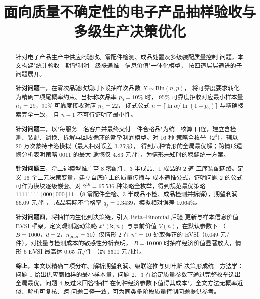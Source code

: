 \documentclass[withoutpreface,bwprint]{cumcmthesis}
\title{面向质量不确定性的电子产品抽样验收与多级生产决策优化}
\begin{document}
\maketitle

\begin{abstract}
针对电子产品生产中供应商验收、零配件检测、成品处置及多级装配质量控制
问题，本文构建"统计验收—期望利润—级联递推—信息价值"一体化模型，
按四道层层递进的子问题展开。

\textbf{针对问题一}，在零次品验收规则下设抽样次品数 $X \sim \mathrm{Bin}(n, p)$，
将可靠度要求转化为精确二项尾概率约束。当标称次品率 $p_0 = 10\%$ 时，
95\% 可靠度拒收对应最小样本量 $n_1 = 29$，90\% 可靠度接收对应 $n_2 = 22$，
闭式公式 $n = \lceil \ln \alpha / \ln(1 - p_0) \rceil$ 与精确搜索完全一致，
且 $n-1$ 不可行证明了最小性。

\textbf{针对问题二}，以"每服务一名客户并最终交付一件合格品"为统一核算
口径，建立含检测、装配、调换、拆解与回收循环的期望利润模型。对 16 种
策略全枚举（$2^4$），辅以 20 万次蒙特卡洛模拟（最大相对误差 1.25\%），
得到六种情形的全局最优解；跨情形遗憾分析表明策略 $0011$ 的最大
遗憾仅 4.83 元/件，为情形未知时的稳健统一方案。

\textbf{针对问题三}，将上述模型推广至 8 零配件、3 半成品、1 成品的 2 道
工序装配网络。定义 16 个二元决策变量，建立自底向上的质量传播与
成本递推公式，证明问题 2 的公式可作为模块逐级嵌套。对 $2^{16} = 65\,536$
种策略全枚举，得到规范最优策略 $11111111\,|\,000\,|\,000\,|\,11$
（8 零配件全检、3 半成品不检、成品检测并拆解），期望利润 66.09 元/件，
成品实际不合格率 $q_f = 0.3439$，模拟相对误差 0.064\%。

\textbf{针对问题四}，将抽样内生化到决策链，引入 Beta--Binomial 后验
更新与样本信息价值 EVSI 框架。定义观测驱动策略
$x^\star(\mathbf{k}, n)$ 与事前价值 $V(n)$，在默认参数下
（$B = 1000$，$d = 2$，$n_{\mathrm{prior}} = 30$）仅情形 2 在 $n^\star = 10$
处取得正的 EVSI（0.049 元/件）。对批量与检测成本的敏感性分析表明，
$B = 10\,000$ 时抽样经济价值显著放大，情形 6 EVSI 最高达 0.65 元/件
（约 6500 元/批）。

\textbf{综上}，本文以精确二项分布、解析期望利润、级联递推与贝叶斯
决策形成统一方法学：问题 1 给出供应商抽样的最小样本量，问题 2、3
在给定质量参数下通过完整枚举选出全局最优，问题 4 反过来回答"抽样
在何种经济参数下值得其成本"。全文方法无概率近似、解析可复核、跨
问题口径一致，可为同类多阶段质量控制问题提供参考。


\end{abstract}
\end{document}

